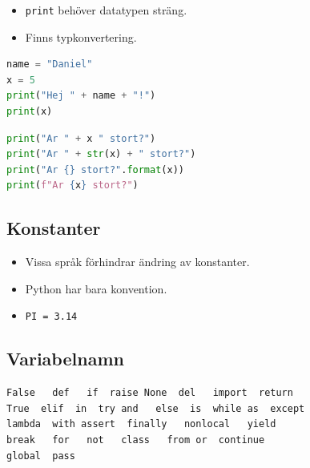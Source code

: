 \begin{frame}[fragile]
  \begin{remark}
    \begin{itemize}
      \item \lstinline{print} behöver datatypen sträng.
      \item Finns typkonvertering.
    \end{itemize}
  \end{remark}

  \begin{example}
    \begin{lstlisting}[language=python]
name = "Daniel"
x = 5
print("Hej " + name + "!")
print(x)
    \end{lstlisting}
  \end{example}
\end{frame}

\begin{frame}[fragile]
  \begin{example}
    \begin{lstlisting}[language=python]
print("Ar " + x " stort?")
print("Ar " + str(x) + " stort?")
print("Ar {} stort?".format(x))
print(f"Ar {x} stort?")
    \end{lstlisting}
  \end{example}
\end{frame}


\subsection{Konstanter}

\begin{frame}
  \begin{remark}
    \begin{itemize}
      \item Vissa språk förhindrar ändring av konstanter.
      \item Python har bara konvention.
      \item \lstinline{PI = 3.14}
    \end{itemize}
  \end{remark}
\end{frame}


\subsection{Variabelnamn}

\begin{frame}[fragile]
  \begin{remark}
    \begin{lstlisting}[numbers=none]
False   def   if  raise None  del   import  return
True  elif  in  try and   else  is  while as  except
lambda  with assert  finally   nonlocal   yield
break   for   not   class   from or  continue
global  pass
    \end{lstlisting}
  \end{remark}
\end{frame}
